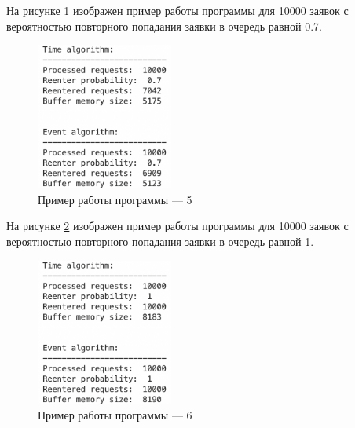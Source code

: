 \documentclass[12pt]{report}
\begin{document}
На рисунке \ref{fig:pic5} изображен пример работы программы для 10000 заявок с вероятностью повторного попадания заявки в очередь равной 0.7.

\begin{figure}[h!btp]
	\centering
	\includegraphics[width=0.4\textwidth]{inc/pic5.png}
	\caption{Пример работы программы --- 5}
	\label{fig:pic5}	
\end{figure}

На рисунке \ref{fig:pic6} изображен пример работы программы для 10000 заявок с вероятностью повторного попадания заявки в очередь равной 1.

\begin{figure}[h!btp]
	\centering
	\includegraphics[width=0.4\textwidth]{inc/pic6.png}
	\caption{Пример работы программы --- 6}
	\label{fig:pic6}	
\end{figure}

	
\end{document}

